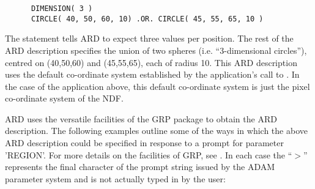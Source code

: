 \small
\begin{verbatim}
      DIMENSION( 3 )
      CIRCLE( 40, 50, 60, 10) .OR. CIRCLE( 45, 55, 65, 10 ) 
\end{verbatim}
\normalsize

The  statement tells ARD to expect three values per position. The rest
of the ARD description specifies the union of two spheres (i.e. ``3-dimensional
circles''), centred on (40,50,60) and (45,55,65), each of radius 10. This ARD
description uses the default co-ordinate system established by the application's
call to . In the case of the application above, this default
co-ordinate system is just the pixel co-ordinate system of the NDF. 

ARD uses the versatile facilities of the GRP package to obtain the ARD
description. The following examples outline some of the ways in which the above
ARD description could be specified in response to a prompt for parameter
'REGION'. For more details on the facilities of GRP, see . In each case
the ``$>$'' represents the final character of the prompt string issued by the
ADAM parameter system and is not actually typed in by the user: 

